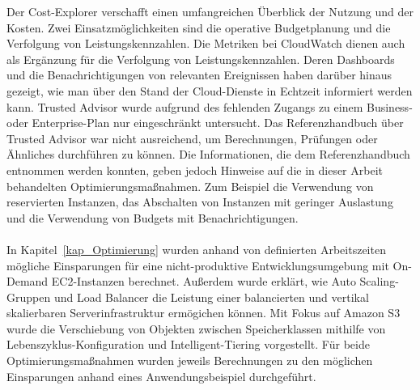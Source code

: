Der Cost-Explorer verschafft einen umfangreichen Überblick der Nutzung und der Kosten. Zwei Einsatzmöglichkeiten sind die operative Budgetplanung und die Verfolgung von Leistungskennzahlen. Die Metriken bei CloudWatch dienen auch als Ergänzung für die Verfolgung von Leistungskennzahlen. Deren Dashboards und die Benachrichtigungen von relevanten Ereignissen haben darüber hinaus gezeigt, wie man über den Stand der Cloud-Dienste in Echtzeit informiert werden kann.
%
Trusted Advisor wurde aufgrund des fehlenden Zugangs zu einem Business- oder Enterprise-Plan nur eingeschränkt untersucht. Das Referenzhandbuch über Trusted Advisor war nicht ausreichend, um Berechnungen, Prüfungen oder Ähnliches durchführen zu können. Die Informationen, die dem Referenzhandbuch entnommen werden konnten, geben jedoch Hinweise auf die in dieser Arbeit behandelten Optimierungsmaßnahmen. %
Zum Beispiel die Verwendung von reservierten Instanzen, das Abschalten von Instanzen mit geringer Auslastung und die Verwendung von Budgets mit Benachrichtigungen.
\\\\
In Kapitel~\ref{kap_Optimierung} wurden anhand von definierten Arbeitszeiten mögliche Einsparungen für eine nicht-produktive Entwicklungsumgebung mit On-Demand EC2-Instanzen berechnet. Außerdem wurde erklärt, wie Auto Scaling-Gruppen und Load Balancer die Leistung einer balancierten und vertikal skalierbaren Serverinfrastruktur ermögichen können. Mit Fokus auf Amazon S3 wurde die Verschiebung von Objekten zwischen Speicherklassen mithilfe von Lebenszyklus-Konfiguration und Intelligent-Tiering vorgestellt. Für beide Optimierungsmaßnahmen wurden jeweils Berechnungen zu den möglichen Einsparungen anhand eines Anwendungsbeispiel durchgeführt.
\\\\
